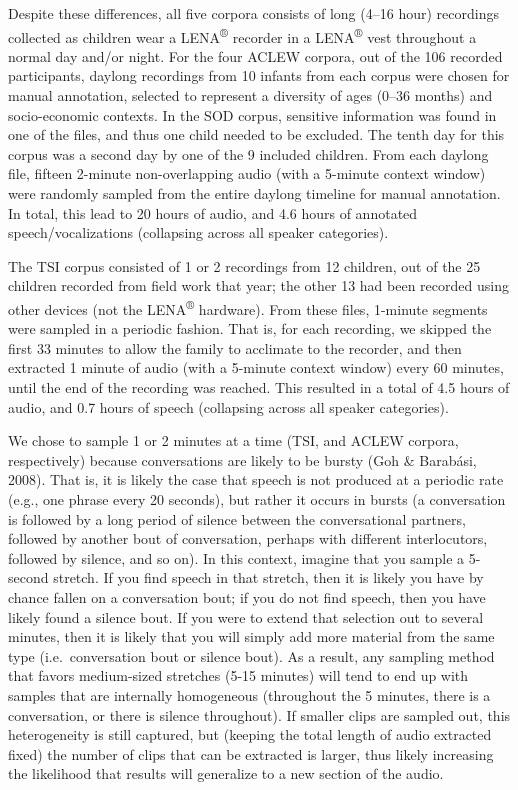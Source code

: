 \documentclass[english,table,man,floatsintext]{apa6}
\begin{document}
Despite these differences, all five corpora consists of long (4--16
hour) recordings collected as children wear a LENA\textsuperscript{®}
recorder in a LENA\textsuperscript{®} vest throughout a normal day
and/or night. For the four ACLEW corpora, out of the 106 recorded
participants, daylong recordings from 10 infants from each corpus were
chosen for manual annotation, selected to represent a diversity of ages
(0--36 months) and socio-economic contexts. In the SOD corpus, sensitive
information was found in one of the files, and thus one child needed to
be excluded. The tenth day for this corpus was a second day by one of
the 9 included children. From each daylong file, fifteen 2-minute
non-overlapping audio (with a 5-minute context window) were randomly
sampled from the entire daylong timeline for manual annotation. In
total, this lead to 20 hours of audio, and 4.6 hours of annotated
speech/vocalizations (collapsing across all speaker categories).

The TSI corpus consisted of 1 or 2 recordings from 12 children, out of
the 25 children recorded from field work that year; the other 13 had
been recorded using other devices (not the LENA\textsuperscript{®}
hardware). From these files, 1-minute segments were sampled in a
periodic fashion. That is, for each recording, we skipped the first 33
minutes to allow the family to acclimate to the recorder, and then
extracted 1 minute of audio (with a 5-minute context window) every 60
minutes, until the end of the recording was reached. This resulted in a
total of 4.5 hours of audio, and 0.7 hours of speech (collapsing across
all speaker categories).

We chose to sample 1 or 2 minutes at a time (TSI, and ACLEW corpora,
respectively) because conversations are likely to be bursty (Goh \&
Barabási, 2008). That is, it is likely the case that speech is not
produced at a periodic rate (e.g., one phrase every 20 seconds), but
rather it occurs in bursts (a conversation is followed by a long period
of silence between the conversational partners, followed by another bout
of conversation, perhaps with different interlocutors, followed by
silence, and so on). In this context, imagine that you sample a 5-second
stretch. If you find speech in that stretch, then it is likely you have
by chance fallen on a conversation bout; if you do not find speech, then
you have likely found a silence bout. If you were to extend that
selection out to several minutes, then it is likely that you will simply
add more material from the same type (i.e.~conversation bout or silence
bout). As a result, any sampling method that favors medium-sized
stretches (5-15 minutes) will tend to end up with samples that are
internally homogeneous (throughout the 5 minutes, there is a
conversation, or there is silence throughout). If smaller clips are
sampled out, this heterogeneity is still captured, but (keeping the
total length of audio extracted fixed) the number of clips that can be
extracted is larger, thus likely increasing the likelihood that results
will generalize to a new section of the audio.
\end{document}
